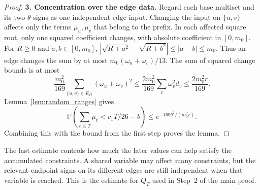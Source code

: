 \documentclass[11pt,a4paper]{article}
\theoremstyle{definition}
\theoremstyle{remark}
\newcommand{\Prb}{\mathbb P}
\begin{document}
\begin{proof}
\par\medskip\noindent\textbf{3. Concentration over the edge data.}
Regard each base multiset and its two $\theta$ signs as one independent
edge input. Changing the input on $\{u,v\}$ affects only the terms
$\mu_u,\mu_v$ that belong to the prefix. In each affected square root,
only one squared coefficient changes, with absolute coefficient in
$[0,m_0]$. For $R\ge0$ and $a,b\in[0,m_0]$,
$|\sqrt{R+a^2}-\sqrt{R+b^2}|\le|a-b|\le m_0$.
Thus an edge changes the sum by at most
$m_0(\omega_u+\omega_v)/13$.
The sum of squared change bounds is at most
\[
 \frac{m_0^2}{169}\sum_{\{u,v\}\in E_H}(\omega_u+\omega_v)^2
 \le\frac{2m_0^2}{169}\sum_v\omega_v^2d_v
 \le\frac{2m_0^2r}{169}.
\]
Lemma~\ref{lem:random_ranges} gives
\[
 \Prb\left(\sum_{t\le T}\mu_t<c_1T/26-b\right)
 \le e^{-169b^2/(m_0^2r)}.
\]
Combining this with the bound from the first step proves the lemma.
\end{proof}

The last estimate controls how much the later values can help satisfy
the accumulated constraints. A shared variable may affect many constraints,
but the relevant endpoint signs on its different edges are still
independent when that variable is reached. This is the estimate for
$Q_T$ used in Step~2 of the main proof.
\end{document}
